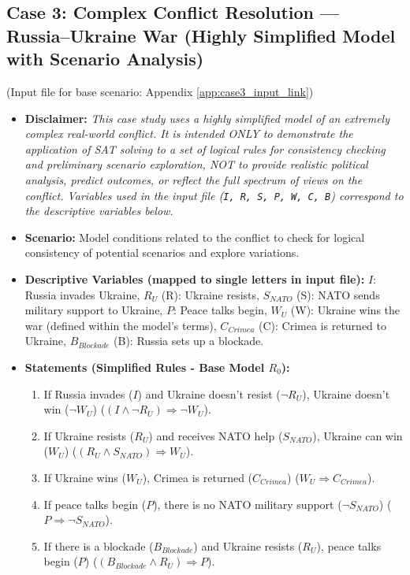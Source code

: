 \documentclass[11pt, a4paper]{article}
\begin{document}
\subsection*{Case 3: Complex Conflict Resolution — Russia–Ukraine War (Highly Simplified Model with Scenario Analysis)}
(Input file for base scenario: Appendix \ref{app:case3_input_link})
\begin{itemize}
    \item \textbf{Disclaimer:} \textit{This case study uses a highly simplified model of an extremely complex real-world conflict. It is intended ONLY to demonstrate the application of SAT solving to a set of logical rules for consistency checking and preliminary scenario exploration, NOT to provide realistic political analysis, predict outcomes, or reflect the full spectrum of views on the conflict. Variables used in the input file (\texttt{I, R, S, P, W, C, B}) correspond to the descriptive variables below.}
    \item \textbf{Scenario:} Model conditions related to the conflict to check for logical consistency of potential scenarios and explore variations.
    \item \textbf{Descriptive Variables (mapped to single letters in input file):}
        $I$: Russia invades Ukraine, $R_U$ (R): Ukraine resists, $S_{NATO}$ (S): NATO sends military support to Ukraine, $P$: Peace talks begin, $W_U$ (W): Ukraine wins the war (defined within the model's terms), $C_{Crimea}$ (C): Crimea is returned to Ukraine, $B_{Blockade}$ (B): Russia sets up a blockade.
    \item \textbf{Statements (Simplified Rules - Base Model $R_0$):}
    \begin{enumerate}
        \item If Russia invades ($I$) and Ukraine doesn't resist ($\neg R_U$), Ukraine doesn't win ($\neg W_U$) ($(I \wedge \neg R_U) \Rightarrow \neg W_U$).
        \item If Ukraine resists ($R_U$) and receives NATO help ($S_{NATO}$), Ukraine can win ($W_U$) ($(R_U \wedge S_{NATO}) \Rightarrow W_U$).
        \item If Ukraine wins ($W_U$), Crimea is returned ($C_{Crimea}$) ($W_U \Rightarrow C_{Crimea}$).
        \item If peace talks begin ($P$), there is no NATO military support ($\neg S_{NATO}$) ($P \Rightarrow \neg S_{NATO}$).
        \item If there is a blockade ($B_{Blockade}$) and Ukraine resists ($R_U$), peace talks begin ($P$) ($(B_{Blockade} \wedge R_U) \Rightarrow P$).

\end{enumerate}
\end{itemize}
\end{document}
